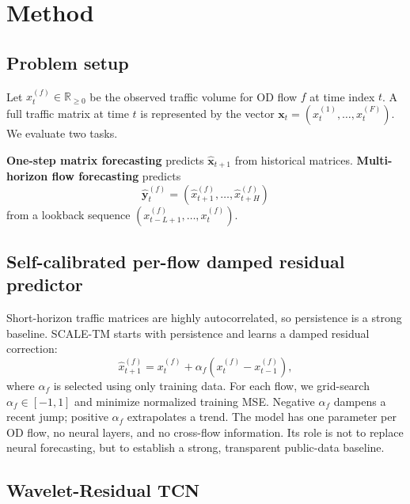 \documentclass{article}
\begin{document}
\section{Method}

\subsection{Problem setup}

Let $x_t^{(f)} \in \mathbb{R}_{\geq 0}$ be the observed traffic volume for OD flow $f$ at time index $t$. A full traffic matrix at time $t$ is represented by the vector $\mathbf{x}_t=(x_t^{(1)},\ldots,x_t^{(F)})$. We evaluate two tasks.

\textbf{One-step matrix forecasting} predicts $\hat{\mathbf{x}}_{t+1}$ from historical matrices. \textbf{Multi-horizon flow forecasting} predicts
\begin{equation}
  \hat{\mathbf{y}}_t^{(f)} =
  (\hat{x}_{t+1}^{(f)}, \ldots, \hat{x}_{t+H}^{(f)})
\end{equation}
from a lookback sequence $(x_{t-L+1}^{(f)},\ldots,x_t^{(f)})$.

\subsection{Self-calibrated per-flow damped residual predictor}

Short-horizon traffic matrices are highly autocorrelated, so persistence is a strong baseline. SCALE-TM starts with persistence and learns a damped residual correction:
\begin{equation}
  \hat{x}_{t+1}^{(f)}
  =
  x_t^{(f)}
  +
  \alpha_f
  \left(x_t^{(f)} - x_{t-1}^{(f)}\right),
  \label{eq:damped}
\end{equation}
where $\alpha_f$ is selected using only training data. For each flow, we grid-search $\alpha_f \in [-1,1]$ and minimize normalized training MSE. Negative $\alpha_f$ dampens a recent jump; positive $\alpha_f$ extrapolates a trend. The model has one parameter per OD flow, no neural layers, and no cross-flow information. Its role is not to replace neural forecasting, but to establish a strong, transparent public-data baseline.

\subsection{Wavelet-Residual TCN}
\end{document}
